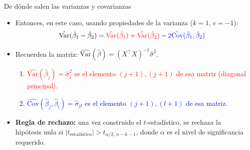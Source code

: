 \documentclass{beamer}
\begin{document}
\begin{frame}[shrink=10]{De dónde salen las varianzas y covarianzas}
    \begin{itemize}
        \item Entonces, en este caso, usando propiedades de la varianza ($k = 1$, $c = -1$):
        \[\hat{\text{Var}}(\hat{\beta}_1 - \hat{\beta}_2) = \textcolor{red}{\hat{\text{Var}}(\hat{\beta}_1) + \hat{\text{Var}}(\hat{\beta}_2)} - \textcolor{blue}{2\hat{\text{Cov}}(\hat{\beta}_1, \hat{\beta}_2)}\]
        \item Recuerden la matriz: $\hat{\text{Var}}(\hat{\beta})= (X^{\top}X)^{-1}\hat{\sigma}^2$.
        \begin{enumerate}
            \item \textcolor{red}{$\hat{\text{Var}}(\hat{\beta}_j) = \hat{\sigma}^2_{j}$ es el elemento $(j + 1), (j + 1)$ de esa matriz (diagonal principal).}
            \item \textcolor{blue}{$\hat{\text{Cov}}(\hat{\beta}_j, \hat{\beta}_l) = \hat{\sigma}_{jl}$ es el elemento $(j + 1), (l + 1)$ de esa matriz.}
        \end{enumerate}
        \item \textbf{Regla de rechazo:} una vez construido el $t$-estadístico, se rechaza la hipótesis nula si $|t_{\text{estadístico}}| > t_{\alpha/2,\,n-k-1}$, donde $\alpha$ es el nivel de significancia requerido.
    \end{itemize}
\end{frame}
\end{document}
